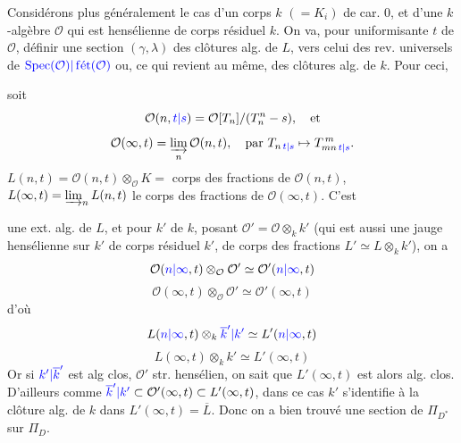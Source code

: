 


Considérons plus généralement le cas d'un corps $k$ $(=K_i)$ de car. $0$, et d'une  $k$-algèbre $\mathcal{O}$ qui est  hensélienne de corps résiduel $k$.
On va, pour  uniformisante $t$ de $\mathcal{O}$, définir une section $(\gamma,\lambda)$     des clôtures alg. de $L$, vers celui des rev. universels de $\textcolor{blue}{\operatorname{Spec}(\mathcal{O})|\operatorname{f\acute{e}t}(\mathcal{O})}$ ou, ce qui revient au même, des clôtures alg. de $k$. Pour ceci,

soit
\[
\mathcal{O}(n,\textcolor{blue}{t|s})=\mathcal{O}[T_n]/(T_n^n-s),\quad\text{et}
\]
\[
\mathcal{O}(\infty,t)=\varinjlim_n\mathcal{O}(n,t),\quad
\text{par }T_{n\,\textcolor{blue}{t|s}}\mapsto T_{mn\,\textcolor{blue}{t|s}}^{\,m}.
\]
$L(n,t)=\mathcal{O}(n,t)\otimes_{\mathcal{O}}K=$ corps des fractions de $\mathcal{O}(n,t)$, $L(\infty,t)=\varinjlim_n L(n,t)$ le corps des fractions de $\mathcal{O}(\infty,t)$. C'est



une ext. alg. de $L$, et pour    $k'$ de $k$, posant $\mathcal{O}'=\mathcal{O}\otimes_k k'$ (qui est aussi une jauge hensélienne sur $k'$ de corps résiduel $k'$, de corps des fractions $L'\simeq L\otimes_k k'$), on a  
\[
\mathcal{O}(\textcolor{blue}{n|\infty},t)\otimes_{\mathcal{O}}\mathcal{O}'\simeq\mathcal{O}'(\textcolor{blue}{n|\infty},t)
\]
\[
\mathcal{O}(\infty,t)\otimes_{\mathcal{O}}\mathcal{O}'\simeq\mathcal{O}'(\infty,t)
\]
d'où
\[
L(\textcolor{blue}{n|\infty},t)\otimes_k\textcolor{blue}{\overline{k}'|k'}\simeq L'(\textcolor{blue}{n|\infty},t)
\]
\[
L(\infty,t)\otimes_k k'\simeq L'(\infty,t)
\]
Or si $\textcolor{blue}{k'|\overline{k}'}$ est alg clos,  $\mathcal{O}'$ str. hensélien, on sait que $L'(\infty,t)$ est alors alg. clos.
D'ailleurs  comme $\textcolor{blue}{\overline{k}'|k'}\subset\mathcal{O}'(\infty,t)\subset L'(\infty,t)$, dans ce cas  $k'$  s'identifie à la clôture alg.  de $k$ dans $L'(\infty,t)=\overline{L}$.
Donc on a bien trouvé une section de $\Pi_{D^*}$ sur $\Pi_D$.

